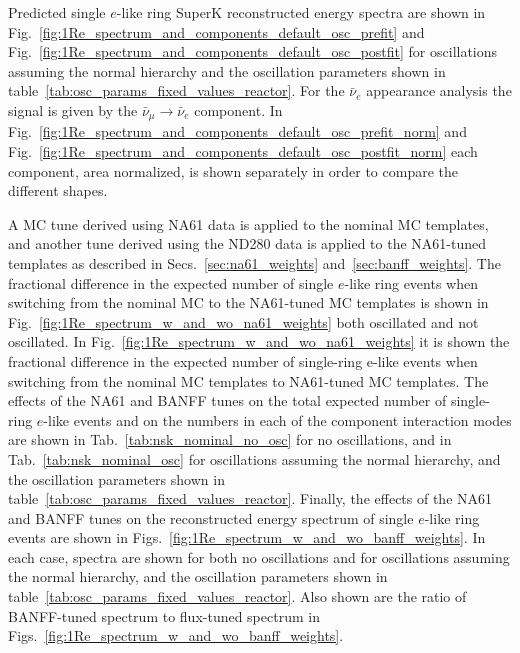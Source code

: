 Predicted single $e$-like ring SuperK reconstructed energy spectra are shown 
in Fig.~\ref{fig:1Re_spectrum_and_components_default_osc_prefit} and Fig.~\ref{fig:1Re_spectrum_and_components_default_osc_postfit}
 for oscillations assuming the normal hierarchy and the oscillation parameters shown in table~\ref{tab:osc_params_fixed_values_reactor}.
For the $\bar{\nu}_e$ appearance analysis the signal is given by the $\bar{\nu}_{\mu} \to \bar{\nu}_e$ component.
In Fig.~\ref{fig:1Re_spectrum_and_components_default_osc_prefit_norm} and Fig.~\ref{fig:1Re_spectrum_and_components_default_osc_postfit_norm}
each component, area normalized, is shown separately in order to compare the different shapes.


A MC tune derived using NA61 data is applied to the nominal MC templates, and another tune derived using the ND280 data is 
applied to the NA61-tuned templates as described in Secs.~\ref{sec:na61_weights} and~\ref{sec:banff_weights}.
%
The fractional difference in the expected number of single $e$-like ring events when switching from the nominal MC to the
NA61-tuned MC templates is shown in Fig.~\ref{fig:1Re_spectrum_w_and_wo_na61_weights} 
both oscillated and not oscillated. 
In Fig.~\ref{fig:1Re_spectrum_w_and_wo_na61_weights} it is shown the fractional difference in the expected number of single-ring e-like events
when switching from the nominal MC templates to NA61-tuned MC templates.
%
The effects of the NA61 and BANFF tunes on the total expected number of single-ring $e$-like events
and on the numbers in each of the \NMCTemplate{} component interaction modes are shown in
Tab.~\ref{tab:nsk_nominal_no_osc} for no oscillations, and in
Tab.~\ref{tab:nsk_nominal_osc} for oscillations assuming the normal hierarchy, and the oscillation parameters shown in table~\ref{tab:osc_params_fixed_values_reactor}.
Finally, the effects of the NA61 and BANFF tunes on the reconstructed energy spectrum of
single $e$-like ring events are shown in
Figs.~\ref{fig:1Re_spectrum_w_and_wo_banff_weights}.
In each case, spectra are shown for both no oscillations and for oscillations assuming the normal hierarchy, and the oscillation parameters shown in table~\ref{tab:osc_params_fixed_values_reactor}.
Also shown are the ratio of BANFF-tuned spectrum to flux-tuned spectrum in Figs.~\ref{fig:1Re_spectrum_w_and_wo_banff_weights}.


